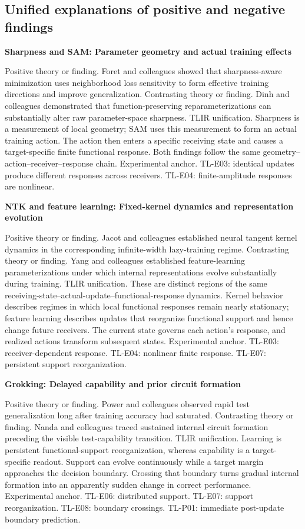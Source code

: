 \documentclass[12pt,letterpaper]{article}
\begin{document}
\subsection{Unified explanations of positive and negative findings}

\noindent\textbf{Sharpness and SAM: Parameter geometry and actual training effects}\par
Positive theory or finding. Foret and colleagues showed that sharpness-aware minimization uses neighborhood loss sensitivity to form effective training directions and improve generalization. \cite{foret2021}
Contrasting theory or finding. Dinh and colleagues demonstrated that function-preserving reparameterizations can substantially alter raw parameter-space sharpness. \cite{dinh2017}
TLIR unification. Sharpness is a measurement of local geometry; SAM uses this measurement to form an actual training action. The action then enters a specific receiving state and causes a target-specific finite functional response. Both findings follow the same geometry--action--receiver--response chain.
Experimental anchor. TL-E03: identical updates produce different responses across receivers. TL-E04: finite-amplitude responses are nonlinear.

\noindent\textbf{NTK and feature learning: Fixed-kernel dynamics and representation evolution}\par
Positive theory or finding. Jacot and colleagues established neural tangent kernel dynamics in the corresponding infinite-width lazy-training regime. \cite{jacot2018}
Contrasting theory or finding. Yang and colleagues established feature-learning parameterizations under which internal representations evolve substantially during training. \cite{yang2021}
TLIR unification. These are distinct regions of the same receiving-state--actual-update--functional-response dynamics. Kernel behavior describes regimes in which local functional responses remain nearly stationary; feature learning describes updates that reorganize functional support and hence change future receivers. The current state governs each action's response, and realized actions transform subsequent states.
Experimental anchor. TL-E03: receiver-dependent response. TL-E04: nonlinear finite response. TL-E07: persistent support reorganization.

\noindent\textbf{Grokking: Delayed capability and prior circuit formation}\par
Positive theory or finding. Power and colleagues observed rapid test generalization long after training accuracy had saturated. \cite{power2022}
Contrasting theory or finding. Nanda and colleagues traced sustained internal circuit formation preceding the visible test-capability transition. \cite{nanda2023}
TLIR unification. Learning is persistent functional-support reorganization, whereas capability is a target-specific readout. Support can evolve continuously while a target margin approaches the decision boundary. Crossing that boundary turns gradual internal formation into an apparently sudden change in correct performance.
Experimental anchor. TL-E06: distributed support. TL-E07: support reorganization. TL-E08: boundary crossings. TL-P01: immediate post-update boundary prediction.
\end{document}
